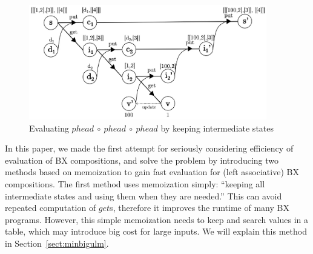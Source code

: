 \begin{figure}[!t]
  \centering
  \includegraphics[height=5cm]{./fig/fig3.eps}
  \caption{Evaluating $phead \ \circ \ phead \ \circ \ phead$ by keeping intermediate states}
  \label{fig:eval-comp-phead-2}
\end{figure}


In this paper, we made the first attempt for seriously considering efficiency of evaluation of BX compositions, and
solve the problem by introducing two methods based on memoization to gain fast evaluation for (left associative) BX compositions.
The first method uses memoization simply: ``keeping all intermediate states and using them when they are needed.'' This can avoid repeated computation of  $get$s, therefore it improves the runtime of many BX programs. However, this simple memoization needs to keep and search values in a table, which may introduce big cost for large inputs. We will explain this method in Section~\ref{sect:minbigulm}.

